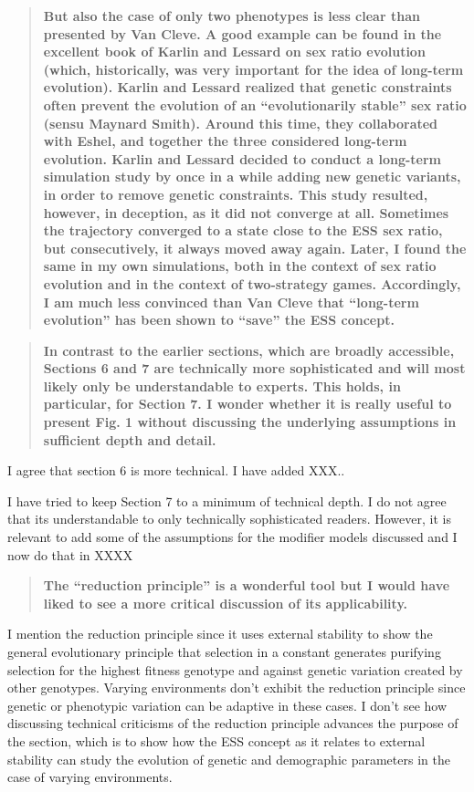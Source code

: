 \documentclass[10pt,parskip=full,foldmarks=off,addrfield=off,backaddress=false,refline=dateleft,letterpaper]{scrlttr2}
\newenvironment{reviewerquote}{\begin{quote}\color{DarkBlue}\bfseries}{\end{quote}}
\begin{document}
\begin{letter}
\begin{reviewerquote}
  But also the case of only two phenotypes is less clear than presented by Van Cleve. A good example can be found in the excellent book of Karlin and Lessard on sex ratio evolution (which, historically, was very important for the idea of long-term evolution). Karlin and Lessard realized that genetic constraints often prevent the evolution of an “evolutionarily stable” sex ratio (sensu Maynard Smith). Around this time, they collaborated with Eshel, and together the three considered long-term evolution. Karlin and Lessard decided to conduct a long-term simulation study by once in a while adding new genetic variants, in order to remove genetic constraints. This study resulted, however, in deception, as it did not converge at all. Sometimes the trajectory converged to a state close to the ESS sex ratio, but consecutively, it always moved away again. Later, I found the same in my own simulations, both in the context of sex ratio evolution and in the context of two-strategy games. Accordingly, I am much less convinced than Van Cleve that “long-term evolution” has been shown to “save” the ESS concept.
\end{reviewerquote}


\begin{reviewerquote}
  In contrast to the earlier sections, which are broadly accessible, Sections 6 and 7 are technically more sophisticated and will most likely only be understandable to experts. This holds, in particular, for Section 7. I wonder whether it is really useful to present Fig. 1 without discussing the underlying assumptions in sufficient depth and detail.
\end{reviewerquote}

I agree that section 6 is more technical. I have added XXX..

I have tried to keep Section 7 to a minimum of technical depth. I do not agree that its understandable to only technically sophisticated readers. However, it is relevant to add some of the assumptions for the modifier models discussed and I now do that in XXXX

\begin{reviewerquote}
  The “reduction principle” is a wonderful tool but I would have liked to see a more critical discussion of its applicability.
\end{reviewerquote}

I mention the reduction principle since it uses external stability to show the general evolutionary principle that selection in a constant generates purifying selection for the highest fitness genotype and against genetic variation created by other genotypes. Varying environments don't exhibit the reduction principle since genetic or phenotypic variation can be adaptive in these cases. I don't see how discussing technical criticisms of the reduction principle advances the purpose of the section, which is to show how the ESS concept as it relates to external stability can study the evolution of genetic and demographic parameters in the case of varying environments.


\end{letter}
\end{document}
